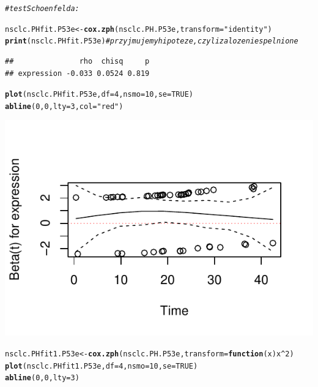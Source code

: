 \documentclass[10pt,a4paper]{article}\usepackage[]{graphicx}\usepackage[]{color}
\makeatletter
\def\maxwidth{ %
  \ifdim\Gin@nat@width>\linewidth
    \linewidth
  \else
    \Gin@nat@width
  \fi
}
\newcommand{\hlnum}[1]{\textcolor[rgb]{0.686,0.059,0.569}{#1}}%
\newcommand{\hlstr}[1]{\textcolor[rgb]{0.192,0.494,0.8}{#1}}%
\newcommand{\hlcom}[1]{\textcolor[rgb]{0.678,0.584,0.686}{\textit{#1}}}%
\newcommand{\hlopt}[1]{\textcolor[rgb]{0,0,0}{#1}}%
\newcommand{\hlstd}[1]{\textcolor[rgb]{0.345,0.345,0.345}{#1}}%
\newcommand{\hlkwa}[1]{\textcolor[rgb]{0.161,0.373,0.58}{\textbf{#1}}}%
\newcommand{\hlkwb}[1]{\textcolor[rgb]{0.69,0.353,0.396}{#1}}%
\newcommand{\hlkwc}[1]{\textcolor[rgb]{0.333,0.667,0.333}{#1}}%
\newcommand{\hlkwd}[1]{\textcolor[rgb]{0.737,0.353,0.396}{\textbf{#1}}}%
\newenvironment{kframe}{%
 \def\at@end@of@kframe{}%
 \ifinner\ifhmode%
  \def\at@end@of@kframe{\end{minipage}}%
  \begin{minipage}{\columnwidth}%
 \fi\fi%
 \def\FrameCommand##1{\hskip\@totalleftmargin \hskip-\fboxsep
 \colorbox{shadecolor}{##1}\hskip-\fboxsep
     \hskip-\linewidth \hskip-\@totalleftmargin \hskip\columnwidth}%
 \MakeFramed {\advance\hsize-\width
   \@totalleftmargin\z@ \linewidth\hsize
   \@setminipage}}%
 {\par\unskip\endMakeFramed%
 \at@end@of@kframe}
\newenvironment{knitrout}{}{} %
\makeatother
\begin{document}
\begin{knitrout}
{}


\begin{kframe}\begin{alltt}
\hlcom{# test Schoenfelda:}

\hlstd{nsclc.PHfit.P53e} \hlkwb{<-} \hlkwd{cox.zph}\hlstd{(nsclc.PH.P53e,} \hlkwc{transform} \hlstd{=} \hlstr{"identity"}\hlstd{)}
\hlkwd{print}\hlstd{(nsclc.PHfit.P53e)}  \hlcom{# przyjmujemy hipoteze, czyli zalozenie spelnione}
\end{alltt}
\begin{verbatim}
##               rho  chisq     p
## expression -0.033 0.0524 0.819
\end{verbatim}
\begin{alltt}
\hlkwd{plot}\hlstd{(nsclc.PHfit.P53e,} \hlkwc{df} \hlstd{=} \hlnum{4}\hlstd{,} \hlkwc{nsmo} \hlstd{=} \hlnum{10}\hlstd{,} \hlkwc{se} \hlstd{=} \hlnum{TRUE}\hlstd{)}
\hlkwd{abline}\hlstd{(}\hlnum{0}\hlstd{,} \hlnum{0}\hlstd{,} \hlkwc{lty} \hlstd{=} \hlnum{3}\hlstd{,} \hlkwc{col} \hlstd{=} \hlstr{"red"}\hlstd{)}
\end{alltt}
\end{kframe}

{\centering \includegraphics[width=\maxwidth]{figure/unnamed-chunk-14} 

}


\begin{kframe}\begin{alltt}
\hlstd{nsclc.PHfit1.P53e} \hlkwb{<-} \hlkwd{cox.zph}\hlstd{(nsclc.PH.P53e,} \hlkwc{transform} \hlstd{=} \hlkwa{function}\hlstd{(}\hlkwc{x}\hlstd{) x}\hlopt{^}\hlnum{2}\hlstd{)}
\hlkwd{plot}\hlstd{(nsclc.PHfit1.P53e,} \hlkwc{df} \hlstd{=} \hlnum{4}\hlstd{,} \hlkwc{nsmo} \hlstd{=} \hlnum{10}\hlstd{,} \hlkwc{se} \hlstd{=} \hlnum{TRUE}\hlstd{)}
\hlkwd{abline}\hlstd{(}\hlnum{0}\hlstd{,} \hlnum{0}\hlstd{,} \hlkwc{lty} \hlstd{=} \hlnum{3}\hlstd{)}
\end{alltt}
\end{kframe}


\end{knitrout}
\end{document}
